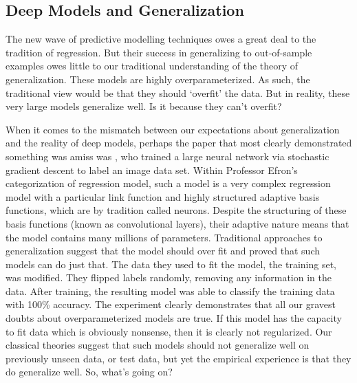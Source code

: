 \documentclass[a4paperpaper,]{article}
\begin{document}
\hypertarget{deep-models-and-generalization}{%
\subsection{Deep Models and
Generalization}\label{deep-models-and-generalization}}


The new wave of predictive modelling techniques owes a great deal to the
tradition of regression. But their success in generalizing to
out-of-sample examples owes little to our traditional understanding of
the theory of generalization. These models are highly overparameterized.
As such, the traditional view would be that they should `overfit' the
data. But in reality, these very large models generalize well. Is it
because they can't overfit?

When it comes to the mismatch between our expectations about
generalization and the reality of deep models, perhaps the paper that
most clearly demonstrated something was amiss was
\citep{Zhang:understanding17}, who trained a large neural network via
stochastic gradient descent to label an image data set. Within Professor
Efron's categorization of regression model, such a model is a very
complex regression model with a particular link function and highly
structured adaptive basis functions, which are by tradition called
neurons. Despite the structuring of these basis functions (known as
convolutional layers), their adaptive nature means that the model
contains many millions of parameters. Traditional approaches to
generalization suggest that the model should over fit and
\citep{Zhang:understanding17} proved that such models can do just that.
The data they used to fit the model, the training set, was modified.
They flipped labels randomly, removing any information in the data.
After training, the resulting model was able to classify the training
data with 100\% accuracy. The experiment clearly demonstrates that all
our gravest doubts about overparameterized models are true. If this
model has the capacity to fit data which is obviously nonsense, then it
is clearly not regularized. Our classical theories suggest that such
models should not generalize well on previously unseen data, or test
data, but yet the empirical experience is that they do generalize well.
So, what's going on?
\end{document}

